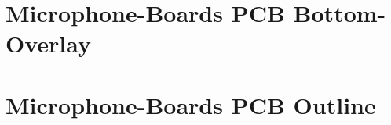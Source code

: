 \section{Microphone-Boards PCB Bottom-Overlay}
\enlargethispage{2.5cm}
\begin{adjustwidth}{-0.23cm}{0cm} \hfuzz=7.0pt \vfuzz=19.0pt
\end{adjustwidth}
\newpage

\section{Microphone-Boards PCB Outline}
\enlargethispage{2.5cm}
\begin{adjustwidth}{0.23cm}{0cm} \hfuzz=7.0pt \vfuzz=19.0pt
\end{adjustwidth}
\newpage

